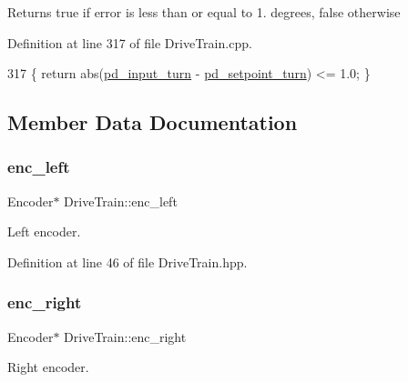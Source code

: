 \begin{DoxyReturn}{Returns}
true if error is less than or equal to 1. degrees, false otherwise 
\end{DoxyReturn}


Definition at line 317 of file Drive\+Train.\+cpp.


\begin{DoxyCode}
317 \{ \textcolor{keywordflow}{return} abs(\hyperlink{class_drive_train_ad7822ae718d02c94e1baed9b3c13bb67}{pd\_input\_turn} - \hyperlink{class_drive_train_a2a1e6c6c70405144799a329bcfd0a969}{pd\_setpoint\_turn}) <= 1.0; \}
\end{DoxyCode}


\subsection{Member Data Documentation}
\mbox{\label{class_drive_train_ab0a54aaa4484970b6890a7c8ebaadf3b}} 
\subsubsection{\texorpdfstring{enc\+\_\+left}{enc\_left}}
{\footnotesize\ttfamily Encoder$\ast$ Drive\+Train\+::enc\+\_\+left\hspace{0.3cm}{\ttfamily [private]}}



Left encoder. 



Definition at line 46 of file Drive\+Train.\+hpp.

\mbox{\label{class_drive_train_aea08b3ba330e27f19b5658446e7cf51a}} 
\subsubsection{\texorpdfstring{enc\+\_\+right}{enc\_right}}
{\footnotesize\ttfamily Encoder$\ast$ Drive\+Train\+::enc\+\_\+right\hspace{0.3cm}{\ttfamily [private]}}



Right encoder. 




